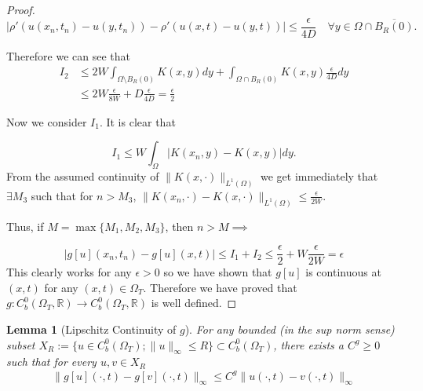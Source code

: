 \documentclass[aps,
preprint,
groupedaddress,
showkeys,
amsmath]{revtex4-2}
\newtheorem{lemma}{Lemma}
\begin{document}
\begin{proof}
       \[|\rho'(u(x_n,t_n)-u(y,t_n))-\rho'(u(x,t)-u(y,t))|\leq \frac{\epsilon}{4D} \quad\forall y\in\Omega\cap \overline{B_R(0)}.\]

        Therefore we can see that
        \begin{equation*}
            \begin{split}
                I_2&\leq 2W\int_{\Omega\setminus B_R(0)}K(x,y)dy+\int_{\Omega\cap B_R(0)}K(x,y)\frac{\epsilon}{4D}dy\\
                &\leq 2W\frac{\epsilon}{8W}+D\frac{\epsilon}{4D}=\frac{\epsilon}{2}
            \end{split}
        \end{equation*}

        Now we consider $I_1$. It is clear that
        
       \[I_1 \leq W\int_{\Omega}|K(x_n,y)-K(x,y)|dy.\] 
        From the assumed continuity of $\|K(x,\cdot)\|_{L^1(\Omega)}$ we get immediately that $\exists M_3$ such that for $n>M_3$, 
        $\|K(x_n,\cdot)- K(x,\cdot)\|_{L^1(\Omega)}\leq \frac{\epsilon}{2W}$.

        Thus, if $M=\max\{M_1,M_2,M_3\}$, then $n>M\implies$
        
       \[|g[u](x_n,t_n)-g[u](x,t)|\leq I_1+I_2\leq \frac{\epsilon}{2}+W\frac{\epsilon}{2W}=\epsilon\]
        This clearly works for any $\epsilon>0$ so we have shown that $g[u]$ is continuous at $(x,t)$ for any $(x,t)\in \Omega _T$. Therefore we have proved that $g:C^0_b(\Omega_T,\mathbb{R})\rightarrow C^0_b(\Omega_T,\mathbb{R})$ is well defined.  
    \end{proof}
    
    \begin{lemma}[Lipschitz Continuity of $g$] \label{LEM:Lipschitzg}
        For any bounded (in the sup norm sense) subset $X_R:=\{u\in C^0_b(\Omega_T);\|u\|_\infty \leq R\}\subset C^0_b(\Omega_T)$, there exists a $C^g\geq 0 $ such that for every $u,v\in X_R$ 
        \begin{equation*}
            \|g[u](\cdot,t)-g[v](\cdot,t)\|_{\infty} \leq C^g\|u(\cdot,t)-v(\cdot,t)\|_{\infty} 
        \end{equation*}
    \end{lemma}
\end{document}
